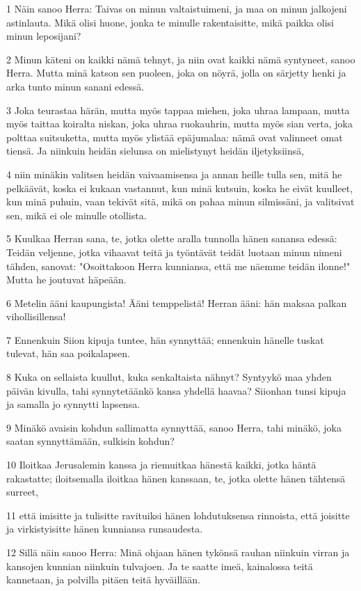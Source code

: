 \par 1 Näin sanoo Herra: Taivas on minun valtaistuimeni, ja maa on minun jalkojeni astinlauta. Mikä olisi huone, jonka te minulle rakentaisitte, mikä paikka olisi minun leposijani?
\par 2 Minun käteni on kaikki nämä tehnyt, ja niin ovat kaikki nämä syntyneet, sanoo Herra. Mutta minä katson sen puoleen, joka on nöyrä, jolla on särjetty henki ja arka tunto minun sanani edessä.
\par 3 Joka teurastaa härän, mutta myös tappaa miehen, joka uhraa lampaan, mutta myös taittaa koiralta niskan, joka uhraa ruokauhrin, mutta myös sian verta, joka polttaa suitsuketta, mutta myös ylistää epäjumalaa: nämä ovat valinneet omat tiensä. Ja niinkuin heidän sielunsa on mielistynyt heidän iljetyksiinsä,
\par 4 niin minäkin valitsen heidän vaivaamisensa ja annan heille tulla sen, mitä he pelkäävät, koska ei kukaan vastannut, kun minä kutsuin, koska he eivät kuulleet, kun minä puhuin, vaan tekivät sitä, mikä on pahaa minun silmissäni, ja valitsivat sen, mikä ei ole minulle otollista.
\par 5 Kuulkaa Herran sana, te, jotka olette aralla tunnolla hänen sanansa edessä: Teidän veljenne, jotka vihaavat teitä ja työntävät teidät luotaan minun nimeni tähden, sanovat: "Osoittakoon Herra kunniansa, että me näemme teidän ilonne!" Mutta he joutuvat häpeään.
\par 6 Metelin ääni kaupungista! Ääni temppelistä! Herran ääni: hän maksaa palkan vihollisillensa!
\par 7 Ennenkuin Siion kipuja tuntee, hän synnyttää; ennenkuin hänelle tuskat tulevat, hän saa poikalapsen.
\par 8 Kuka on sellaista kuullut, kuka senkaltaista nähnyt? Syntyykö maa yhden päivän kivulla, tahi synnytetäänkö kansa yhdellä haavaa? Siionhan tunsi kipuja ja samalla jo synnytti lapsensa.
\par 9 Minäkö avaisin kohdun sallimatta synnyttää, sanoo Herra, tahi minäkö, joka saatan synnyttämään, sulkisin kohdun?
\par 10 Iloitkaa Jerusalemin kanssa ja riemuitkaa hänestä kaikki, jotka häntä rakastatte; iloitsemalla iloitkaa hänen kanssaan, te, jotka olette hänen tähtensä surreet,
\par 11 että imisitte ja tulisitte ravituiksi hänen lohdutuksensa rinnoista, että joisitte ja virkistyisitte hänen kunniansa runsaudesta.
\par 12 Sillä näin sanoo Herra: Minä ohjaan hänen tykönsä rauhan niinkuin virran ja kansojen kunnian niinkuin tulvajoen. Ja te saatte imeä, kainalossa teitä kannetaan, ja polvilla pitäen teitä hyväillään.

